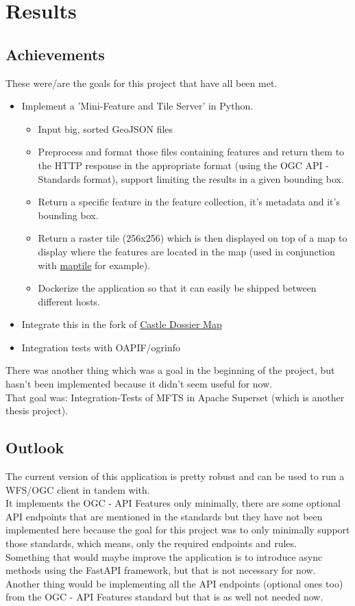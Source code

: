 \chapter{Results}

\section{Achievements}
These were/are the goals for this project that have all been met.\\
\begin{itemize}
	\item Implement a 'Mini-Feature and Tile Server' in Python.
	\begin{itemize}
		\item Input big, sorted GeoJSON files
		\item Preprocess and format those files containing features and return them to the HTTP response in the appropriate format (using the OGC API - Standards format), support limiting the results in a given bounding box.
		\item Return a specific feature in the feature collection, it's metadata and it's bounding box.
		\item Return a raster tile (256x256) which is then displayed on top of a map to display where the features are located in the map (used in conjunction with \href{maptile.com}{maptile} for example).
		\item Dockerize the application so that it can easily be shipped between different hosts.
	\end{itemize}
	\item Integrate this in the fork of \href{https://gitlab.com/geometalab/castle-map}{Castle Dossier Map}
	\item Integration tests with OAPIF/ogrinfo
\end{itemize}
There was another thing which was a goal in the beginning of the project, but hasn't been implemented because it didn't seem useful for now.\\
That goal was: Integration-Tests of MFTS in Apache Superset (which is another thesis project).
\newpage
\section{Outlook}
The current version of this application is pretty robust and can be used to run a WFS/OGC client in tandem with.\\
It implements the OGC - API Features only minimally, there are some optional API endpoints that are mentioned in the standards but they have not been implemented here because the goal for this project was to only minimally support those standards, which means, only the required endpoints and rules.\\
\newline
Something that would maybe improve the application is to introduce async methods using the FastAPI framework, but that is not necessary for now.\\
Another thing would be implementing all the API endpoints (optional ones too) from the OGC - API Features standard but that is as well not needed now.
